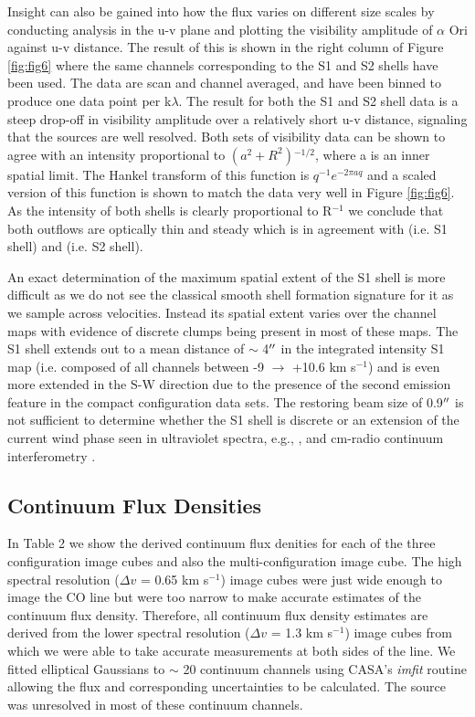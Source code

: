 \documentclass[iop]{emulateapj}
\begin{document}
Insight can also be gained into how the flux varies on different size scales by conducting analysis in the u-v plane and plotting the visibility amplitude of $\alpha$ Ori against u-v distance. The result of this is shown in the right column of Figure \ref{fig:fig6} where the same channels corresponding to the S1 and S2 shells have been used. The data are scan and channel averaged, and have been binned to produce one data point per k$\lambda$. The result for both the S1 and S2 shell data is a steep drop-off in visibility amplitude over a relatively short u-v distance, signaling that the sources are well resolved. Both sets of visibility data can be shown to agree with an intensity proportional to $(a^2 + R^2){}^{-1/2}$, where a is an inner spatial limit. The Hankel transform of this function is $q^{-1}e^{-2\pi aq}$  \citep{2000fta..book.....B} and a scaled version of this function is shown to match the data very well in Figure \ref{fig:fig6}. As the intensity of both shells is clearly proportional to R${}^{-1}$ we conclude that both outflows are  optically thin and steady which is in agreement with \cite{2009AJ....137.3558S} (i.e. S1 shell) and \cite{2002A&A...386.1009P} (i.e. S2 shell). 

An exact determination of the maximum spatial extent of the S1 shell is more difficult as we do not see the classical smooth shell formation signature for it as we sample across velocities. Instead its spatial extent varies over the channel maps with evidence of discrete clumps being present in most of these maps. The S1 shell extends out to a mean distance of $\sim$ 4$\mbox{$^{\prime\prime}$}$ in the integrated intensity S1 map (i.e. composed of all channels between -9 $\rightarrow$ +10.6 km s${}^{-1}$) and is even more extended in the S-W direction due to the presence of the second emission feature in the compact configuration data sets. The restoring beam size of 0.9$\mbox{$^{\prime\prime}$}$ is not sufficient to determine whether the S1 shell is discrete or an extension of the current wind phase seen in ultraviolet spectra, e.g., \citep{1997ApJ...479..970C}, and cm-radio continuum interferometry \citep{1998Natur.392..575L, harper_2001}.

\subsection{Continuum Flux Densities} \label{results4} 

In Table 2 we show the derived continuum flux denities for each of the three configuration image cubes and also the multi-configuration image cube. The high spectral resolution ($\Delta v$ = 0.65 km s${}^{-1}$) image cubes were just wide enough to image the CO line but were too narrow to make accurate estimates of the continuum flux density. Therefore, all continuum flux density estimates are derived from the lower spectral resolution ($\Delta v$ = 1.3 km s${}^{-1}$) image cubes from which we were able to take accurate measurements at both sides of the line. We fitted elliptical Gaussians to $\sim$ 20 continuum channels using CASA's \textit{imfit} routine allowing the flux and corresponding uncertainties to be calculated. The source was unresolved in most of these continuum channels. 
\end{document}
